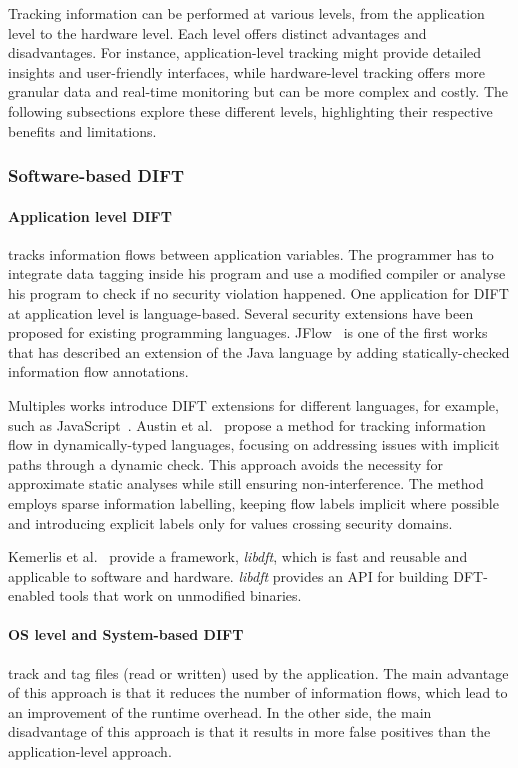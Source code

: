 Tracking information can be performed at various levels, from the application level to the hardware level. Each level offers distinct advantages and disadvantages.
For instance, application-level tracking might provide detailed insights and user-friendly interfaces, while hardware-level tracking offers more granular data and real-time monitoring but can be more complex and costly.
The following subsections explore these different levels, highlighting their respective benefits and limitations.


\subsubsection{Software-based DIFT}
\paragraph{Application level DIFT} tracks information flows between application variables. The programmer has to integrate data tagging inside his program and use a modified compiler or analyse his program to check if no security violation happened.
One application for DIFT at application level is language-based. Several security extensions have been proposed for existing programming languages.
JFlow~\cite{M-99-popl} is one of the first works that has described an extension of the Java language by adding statically-checked information flow annotations.

Multiples works introduce DIFT extensions for different languages, for example, such as JavaScript~\cite{CN-15-ccs, AF-09-plas}.
Austin et al.~\cite{AF-09-plas} propose a method for tracking information flow in dynamically-typed languages, focusing on addressing issues with implicit paths through a dynamic check. This approach avoids the necessity for approximate static analyses while still ensuring non-interference. The method employs sparse information labelling, keeping flow labels implicit where possible and introducing explicit labels only for values crossing security domains.

Kemerlis et al.~\cite{KPJK-12-sigplan} provide a framework, \textit{libdft}, which is fast and reusable and applicable to software and hardware. \textit{libdft} provides an API for building DFT-enabled tools that work on unmodified binaries.

\paragraph{OS level and System-based DIFT} track and tag files (read or written) used by the application.
The main advantage of this approach is that it reduces the number of information flows, which lead to an improvement of the runtime overhead. In the other side, the main disadvantage of this approach is that it results in more false positives than the application-level approach.

